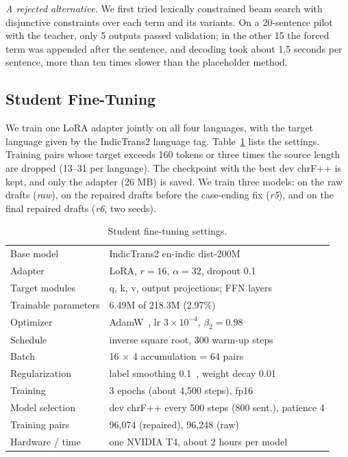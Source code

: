 \documentclass[conference]{IEEEtran}
\begin{document}
\emph{A rejected alternative.} We first tried lexically constrained beam search with disjunctive constraints over each term and its variants. On a 20-sentence pilot with the teacher, only 5 outputs passed validation; in the other 15 the forced term was appended after the sentence, and decoding took about 1.5 seconds per sentence, more than ten times slower than the placeholder method.

\subsection{Student Fine-Tuning}
We train one LoRA adapter jointly on all four languages, with the target language given by the IndicTrans2 language tag. Table~\ref{tab:hyper} lists the settings. Training pairs whose target exceeds 160 tokens or three times the source length are dropped (13--31 per language). The checkpoint with the best dev chrF++ is kept, and only the adapter (26 MB) is saved. We train three models: on the raw drafts (\emph{raw}), on the repaired drafts before the case-ending fix (\emph{r5}), and on the final repaired drafts (\emph{r6}, two seeds).

\begin{table}[t]
\caption{Student fine-tuning settings.}
\label{tab:hyper}
\centering
\footnotesize
\begin{tabular}{@{}ll@{}}
\toprule
Base model & IndicTrans2 en-indic dist-200M \\
Adapter & LoRA, $r=16$, $\alpha=32$, dropout 0.1 \\
Target modules & q, k, v, output projections; FFN layers \\
Trainable parameters & 6.49M of 218.3M (2.97\%) \\
Optimizer & AdamW~\cite{loshchilov2019decoupled}, lr $3\times10^{-4}$, $\beta_2=0.98$ \\
Schedule & inverse square root, 300 warm-up steps \\
Batch & 16 $\times$ 4 accumulation = 64 pairs \\
Regularization & label smoothing 0.1~\cite{szegedy2016rethinking}, weight decay 0.01 \\
Training & 3 epochs (about 4,500 steps), fp16 \\
Model selection & dev chrF++ every 500 steps (800 sent.), patience 4 \\
Training pairs & 96,074 (repaired), 96,248 (raw) \\
Hardware / time & one NVIDIA T4, about 2 hours per model \\
\bottomrule
\end{tabular}
\end{table}
\end{document}
